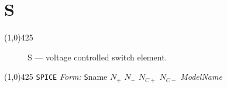 \oddsidemargin 10mm \topmargin 0.0in \textwidth 5.5in \textheight
7.375in \evensidemargin 1.0in \headheight 0.18in \footskip 0.16in
%
\section[S \- Voltage Controlled Switch]{ \hspace{70mm}\huge\textbf{S}}
\linethickness{1mm}
\line(1,0){425}
\normalsize
\begin{figure}[h]
\centerline{\epsfxsize=2in} \caption{S ---
voltage controlled switch element.\label{fig:port}}
\end{figure}
\newline
\linethickness{0.5mm} \line(1,0){425}
\newline
\texttt{SPICE} \textit{Form:}
\newline
{\tt S}name $N_{+}$ $N_{-}$ $N_{C+}$ $N_{C-}$ {\it ModelName}
   \E {}\E

